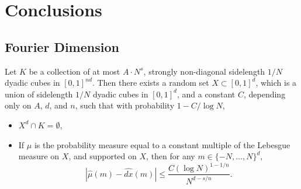 
\chapter{Conclusions}
\label{ch:Conclusions}

\section{Fourier Dimension}

\begin{theorem}
    Let $K$ be a collection of at most $A \cdot N^s$, strongly non-diagonal sidelength $1/N$ dyadic cubes in $[0,1]^{nd}$. Then there exists a random set $X \subset [0,1]^d$, which is a union of sidelength $1/N$ dyadic cubes in $[0,1]^d$, and a constant $C$, depending only on $A$, $d$, and $n$, such that with probability $1 - C/\log N$,
    \begin{itemize}
        \item $X^d \cap K = \emptyset$,
        \item If $\mu$ is the probability measure equal to a constant multiple of the Lebesgue measure on $X$, and supported on $X$, then for any $m \in \{ -N, \dots, N \}^d$,
        \[ |\widehat{\mu}(m) - \widehat{dx}(m)| \leq \frac{C (\log N)^{1 - 1/n}}{N^{d-s/n}}. \]
    \end{itemize}
\end{theorem}
